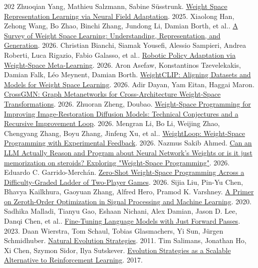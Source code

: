 \begin{thebibliography}{202}
 Zhuoqian Yang, Mathieu Salzmann, Sabine Süsstrunk. \href{https://arxiv.org/abs/2512.01759v3}{Weight Space Representation Learning via Neural Field Adaptation}. 2025.
 Xiaolong Han, Zehong Wang, Bo Zhao, Binchi Zhang, Jundong Li, Damian Borth, et al.. \href{https://arxiv.org/abs/2603.10090v1}{A Survey of Weight Space Learning: Understanding, Representation, and Generation}. 2026.
 Christian Bianchi, Siamak Yousefi, Alessio Sampieri, Andrea Roberti, Luca Rigazio, Fabio Galasso, et al.. \href{https://arxiv.org/abs/2606.07217v1}{Robotic Policy Adaptation via Weight-Space Meta-Learning}. 2026.
 Aron Asefaw, Konstantinos Tzevelekakis, Damian Falk, Léo Meynent, Damian Borth. \href{https://arxiv.org/abs/2607.03551v1}{WeightCLIP: Aligning Datasets and Models for Weight Space Learning}. 2026.
 Adir Dayan, Yam Eitan, Haggai Maron. \href{https://arxiv.org/abs/2610.01649v1}{CrossGMN: Graph Metanetworks for Cross-Architecture Weight-Space Transformations}. 2026.
 Zhuoran Zheng,  Doubao. \href{https://arxiv.org/abs/2611.04268v1}{Weight-Space Programming for Improving Image-Restoration Diffusion Models: Technical Conjectures and a Recursive Improvement Loop}. 2026.
 Mengran Li, Bo Li, Weijing Zhao, Chengyang Zhang, Boyu Zhang, Jinfeng Xu, et al.. \href{https://arxiv.org/abs/2611.07319v1}{WeightLoop: Weight-Space Programming with Experimental Feedback}. 2026.
 Nazmus Sakib Ahmed. \href{https://arxiv.org/abs/2611.08070v1}{Can an LLM Actually Reason and Program about Neural Network's Weights or is it just memorization on steroids? Exploring "Weight-Space Programming"}. 2026.
 Eduardo C. Garrido-Merchán. \href{https://arxiv.org/abs/2611.09271v1}{Zero-Shot Weight-Space Programming Across a Difficulty-Graded Ladder of Two-Player Games}. 2026.
 Sijia Liu, Pin-Yu Chen, Bhavya Kailkhura, Gaoyuan Zhang, Alfred Hero, Pramod K. Varshney. \href{https://arxiv.org/abs/2006.06224}{A Primer on Zeroth-Order Optimization in Signal Processing and Machine Learning}. 2020.
 Sadhika Malladi, Tianyu Gao, Eshaan Nichani, Alex Damian, Jason D. Lee, Danqi Chen, et al.. \href{https://arxiv.org/abs/2305.17333}{Fine-Tuning Language Models with Just Forward Passes}. 2023.
 Daan Wierstra, Tom Schaul, Tobias Glasmachers, Yi Sun, Jürgen Schmidhuber. \href{https://arxiv.org/abs/1106.4487v1}{Natural Evolution Strategies}. 2011.
 Tim Salimans, Jonathan Ho, Xi Chen, Szymon Sidor, Ilya Sutskever. \href{https://arxiv.org/abs/1703.03864}{Evolution Strategies as a Scalable Alternative to Reinforcement Learning}. 2017.

\end{thebibliography}
